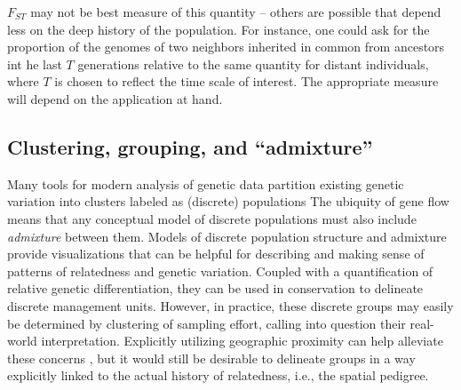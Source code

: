 \documentclass{ar-1col}
\newcommand{\plr}[1]{{\color{green}{#1}}}
\begin{document}
$F_{ST}$ may not be best measure of this quantity -- 
others are possible that depend less on the deep history of the population.
For instance,
one could ask for the proportion of the genomes of two neighbors 
inherited in common from ancestors int he last $T$ generations
relative to the same quantity for distant individuals,
where $T$ is chosen to reflect the time scale of interest.
The appropriate measure will depend on the application at hand.

\subsection{Clustering, grouping, and ``admixture''}

\plr{I think there's some redundancy below.}

Many tools for modern analysis of genetic data
partition existing genetic variation into clusters labeled as (discrete) populations
\citep[e.g.,][]{STRUCTURE, ADMIXTURE}
The ubiquity of gene flow means that
any conceptual model of discrete populations 
must also include \emph{admixture} between them.
Models of discrete population structure and admixture 
provide visualizations that can be helpful for
describing and making sense of patterns of relatedness and genetic variation.
Coupled with a quantification of relative genetic differentiation,
they can be used in conservation to delineate discrete management units.
However, in practice, these discrete groups may easily be determined
by clustering of sampling effort,
calling into question their real-world interpretation.
Explicitly utilizing geographic proximity can help alleviate these concerns \citep{conStruct},
but it would still be desirable to delineate groups in a way explicitly linked
to the actual history of relatedness, i.e., the spatial pedigree.
\end{document}
